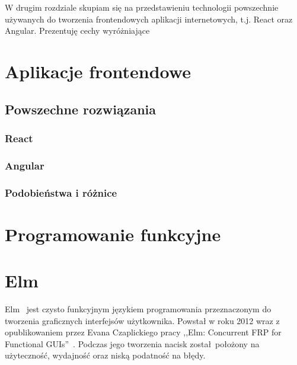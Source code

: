 \documentclass[twoside,a4paper]{report}
\begin{document}
W drugim rozdziale skupiam się na przedstawieniu technologii powszechnie używanych do tworzenia frontendowych aplikacji internetowych, t.j. React oraz Angular. Prezentuję cechy wyróżniające


\chapter{Aplikacje frontendowe}

\section{Powszechne rozwiązania}

\subsection{React}
\cite{react}
\cite{reactdocs}
\subsection{Angular}
\cite{angularjs}
\cite{angulardocs}
\subsection{Podobieństwa i różnice}



\chapter{Programowanie funkcyjne}


\chapter{Elm}
Elm~\cite{elmdocs} jest czysto funkcyjnym językiem programowania przeznaczonym do tworzenia graficznych interfejsów użytkownika. Powstał w roku 2012 wraz z opublikowaniem przez Evana Czaplickiego pracy ,,Elm: Concurrent FRP for Functional GUIs''~\cite{Czaplicki2012ElmC}. Podczas jego tworzenia nacisk został położony na użyteczność, wydajność oraz niską podatność na błędy.
\end{document}

